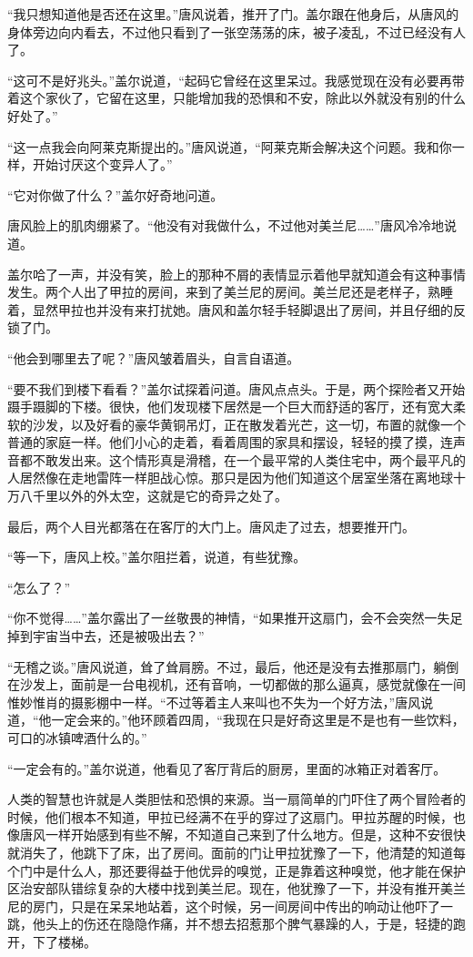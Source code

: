 “我只想知道他是否还在这里。”唐风说着，推开了门。盖尔跟在他身后，从唐风的身体旁边向内看去，不过他只看到了一张空荡荡的床，被子凌乱，不过已经没有人了。

“这可不是好兆头。”盖尔说道，“起码它曾经在这里呆过。我感觉现在没有必要再带着这个家伙了，它留在这里，只能增加我的恐惧和不安，除此以外就没有别的什么好处了。”

“这一点我会向阿莱克斯提出的。”唐风说道，“阿莱克斯会解决这个问题。我和你一样，开始讨厌这个变异人了。”

“它对你做了什么？”盖尔好奇地问道。

唐风脸上的肌肉绷紧了。“他没有对我做什么，不过他对美兰尼……”唐风冷冷地说道。

盖尔哈了一声，并没有笑，脸上的那种不屑的表情显示着他早就知道会有这种事情发生。两个人出了甲拉的房间，来到了美兰尼的房间。美兰尼还是老样子，熟睡着，显然甲拉也并没有来打扰她。唐风和盖尔轻手轻脚退出了房间，并且仔细的反锁了门。

“他会到哪里去了呢？”唐风皱着眉头，自言自语道。

“要不我们到楼下看看？”盖尔试探着问道。唐风点点头。于是，两个探险者又开始蹑手蹑脚的下楼。很快，他们发现楼下居然是一个巨大而舒适的客厅，还有宽大柔软的沙发，以及好看的豪华黄铜吊灯，正在散发着光芒，这一切，布置的就像一个普通的家庭一样。他们小心的走着，看着周围的家具和摆设，轻轻的摸了摸，连声音都不敢发出来。这个情形真是滑稽，在一个最平常的人类住宅中，两个最平凡的人居然像在走地雷阵一样胆战心惊。那只是因为他们知道这个居室坐落在离地球十万八千里以外的外太空，这就是它的奇异之处了。

最后，两个人目光都落在在客厅的大门上。唐风走了过去，想要推开门。

“等一下，唐风上校。”盖尔阻拦着，说道，有些犹豫。

“怎么了？”

“你不觉得……”盖尔露出了一丝敬畏的神情，“如果推开这扇门，会不会突然一失足掉到宇宙当中去，还是被吸出去？”

“无稽之谈。”唐风说道，耸了耸肩膀。不过，最后，他还是没有去推那扇门，躺倒在沙发上，面前是一台电视机，还有音响，一切都做的那么逼真，感觉就像在一间惟妙惟肖的摄影棚中一样。“不过等着主人来叫也不失为一个好方法，”唐风说道，“他一定会来的。”他环顾着四周，“我现在只是好奇这里是不是也有一些饮料，可口的冰镇啤酒什么的。”

“一定会有的。”盖尔说道，他看见了客厅背后的厨房，里面的冰箱正对着客厅。

人类的智慧也许就是人类胆怯和恐惧的来源。当一扇简单的门吓住了两个冒险者的时候，他们根本不知道，甲拉已经满不在乎的穿过了这扇门。甲拉苏醒的时候，也像唐风一样开始感到有些不解，不知道自己来到了什么地方。但是，这种不安很快就消失了，他跳下了床，出了房间。面前的门让甲拉犹豫了一下，他清楚的知道每个门中是什么人，那还要得益于他优异的嗅觉，正是靠着这种嗅觉，他才能在保护区治安部队错综复杂的大楼中找到美兰尼。现在，他犹豫了一下，并没有推开美兰尼的房门，只是在呆呆地站着，这个时候，另一间房间中传出的响动让他吓了一跳，他头上的伤还在隐隐作痛，并不想去招惹那个脾气暴躁的人，于是，轻捷的跑开，下了楼梯。

